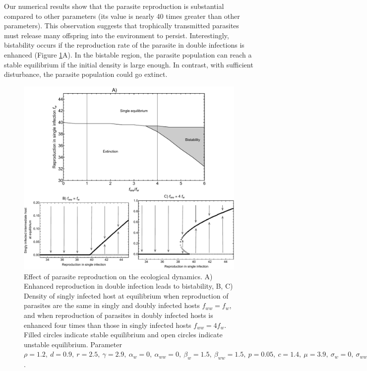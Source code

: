 \documentclass[a4paper]{scrartcl}
\begin{document}
Our numerical results show that the parasite reproduction is substantial compared to other parameters (its value is nearly 40 times greater than other parameters).
This observation suggests that trophically transmitted parasites must release many offspring into the environment to persist. 
Interestingly, bistability occurs if the reproduction rate of the parasite in double infections is enhanced (Figure \ref{fig:bistability}A). 
In the bistable region, the parasite population can reach a stable equilibrium if the initial density is large enough. 
In contrast, with sufficient disturbance, the parasite population could go extinct.

\begin{figure}[!ht]
\captionsetup{format=plain}
\includegraphics[width = \textwidth]{Figures/reproduction_bifurcation.pdf}
\caption{Effect of parasite reproduction on the ecological dynamics. A) Enhanced reproduction in double infection leads to bistability, B, C) Density of singly infected host at equilibrium when reproduction of parasites are the same in singly and doubly infected hosts $f_{ww} = f_w$, and when reproduction of parasites in doubly infected hosts is enhanced four times than those in singly infected hosts $f_{ww} = 4 f_w$. Filled circles indicate stable equilibrium and open circles indicate unstable equilibrium. Parameter $\rho = 1.2, \  d = 0.9, \  r = 2.5, \ \gamma = 2.9, \ \alpha_w = 0, \ \alpha_{ww} =  0, \ \beta_w = 1.5, \ \beta_{ww} = 1.5, \ p = 0.05, \  c = 1.4, \ \mu = 3.9,  \ \sigma_w = 0, \ \sigma_{ww} = 0, \  q = 0.05, \ \delta = 0.9, \ k = 0.26, \ h = 0.6$.
}
\label{fig:bistability}
\end{figure}
\end{document}
